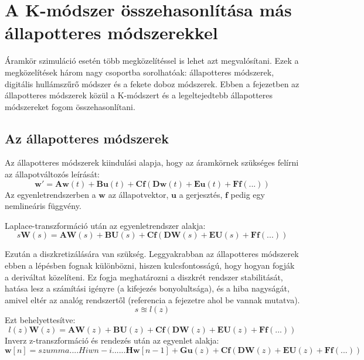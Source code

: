 \chapter{A K-módszer összehasonlítása más állapotteres módszerekkel}

Áramkör szimuláció esetén több megközelítéssel is lehet azt megvalósítani. Ezek a megközelítések három nagy csoportba sorolhatóak: állapotteres módszerek, digitális hullámszűrő módszer és a fekete doboz módszerek. Ebben a fejezetben az állapotteres módszerek közül a K-módszert és a legeltejedtebb állapotteres módszereket fogom összehasonlítani.

\section{Az állapotteres módszerek}

Az állapotteres módszerek kiindulási alapja, hogy az áramkörnek szükséges felírni az állapotváltozós leírását:
\begin{equation}
    \mathbf{w'}=\mathbf{Aw}(t)+\mathbf{Bu}(t)+\mathbf{Cf}(\mathbf{Dw}(t)+\mathbf{Eu}(t)+\mathbf{Ff}(...))
\end{equation}
Az egyenletrendszerben a $\mathbf{w}$ az állapotvektor, $\mathbf{u}$ a gerjesztés, $\mathbf{f}$ pedig egy nemlineáris függvény.

Laplace-transzformáció után az egyenletrendszer alakja:
\begin{equation}
    s\mathbf{W}(s)=\mathbf{AW}(s)+\mathbf{BU}(s)+\mathbf{Cf}(\mathbf{DW}(s)+\mathbf{EU}(s)+\mathbf{Ff}(...))
\end{equation}

Ezután a diszkretizálására van szükség. Leggyakrabban az állapotteres módszerek ebben a lépésben fognak különbözni, hiszen kulcsfontosságú, hogy hogyan fogják a deriváltat közelíteni. Ez fogja meghatározni a diszkrét rendszer stabilitását, hatása lesz a számítási igényre (a kifejezés bonyolultsága), és a hiba nagyságát, amivel eltér az analóg rendszertől (referencia a fejezetre ahol be vannak mutatva).
\begin{equation}
    s \approxeq l(z)
\end{equation}
Ezt behelyettesítve:
\begin{equation}
    l(z)\mathbf{W}(z)=\mathbf{AW}(z)+\mathbf{BU}(z)+\mathbf{Cf}(\mathbf{DW}(z)+\mathbf{EU}(z)+\mathbf{Ff}(...))
\end{equation}
Inverz z-transzformáció és rendezés után az egyenlet alakja:
\begin{equation}
    \mathbf{w}[n]=szumma....Hiwn-i......\mathbf{Hw}[n-1]+\mathbf{Gu}(z)+\mathbf{Cf}(\mathbf{DW}(z)+\mathbf{EU}(z)+\mathbf{Ff}(...))
\end{equation}


